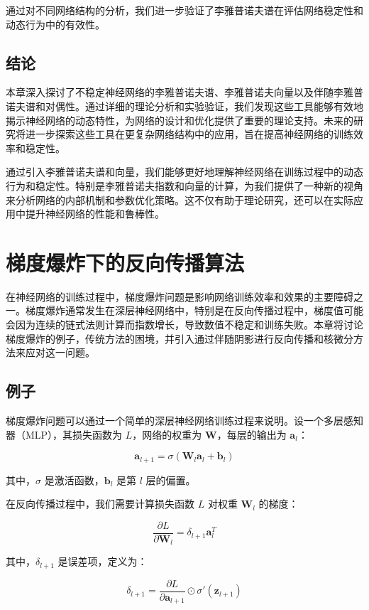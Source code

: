\documentclass[12pt,a4paper]{amsart}
\begin{document}
通过对不同网络结构的分析，我们进一步验证了李雅普诺夫谱在评估网络稳定性和动态行为中的有效性。

\subsection{结论}

本章深入探讨了不稳定神经网络的李雅普诺夫谱、李雅普诺夫向量以及伴随李雅普诺夫谱和对偶性。通过详细的理论分析和实验验证，我们发现这些工具能够有效地揭示神经网络的动态特性，为网络的设计和优化提供了重要的理论支持。未来的研究将进一步探索这些工具在更复杂网络结构中的应用，旨在提高神经网络的训练效率和稳定性。

通过引入李雅普诺夫谱和向量，我们能够更好地理解神经网络在训练过程中的动态行为和稳定性。特别是李雅普诺夫指数和向量的计算，为我们提供了一种新的视角来分析网络的内部机制和参数优化策略。这不仅有助于理论研究，还可以在实际应用中提升神经网络的性能和鲁棒性。

\section{梯度爆炸下的反向传播算法}

在神经网络的训练过程中，梯度爆炸问题是影响网络训练效率和效果的主要障碍之一。梯度爆炸通常发生在深层神经网络中，特别是在反向传播过程中，梯度值可能会因为连续的链式法则计算而指数增长，导致数值不稳定和训练失败。本章将讨论梯度爆炸的例子，传统方法的困境，并引入通过伴随阴影进行反向传播和核微分方法来应对这一问题。

\subsection{例子}

梯度爆炸问题可以通过一个简单的深层神经网络训练过程来说明。设一个多层感知器（MLP），其损失函数为 \( L \)，网络的权重为 \(\mathbf{W}\)，每层的输出为 \(\mathbf{a}_l\)：

\[ \mathbf{a}_{l+1} = \sigma(\mathbf{W}_l \mathbf{a}_l + \mathbf{b}_l) \]

其中，\(\sigma\) 是激活函数，\(\mathbf{b}_l\) 是第 \(l\) 层的偏置。

在反向传播过程中，我们需要计算损失函数 \(L\) 对权重 \(\mathbf{W}_l\) 的梯度：

\[ \frac{\partial L}{\partial \mathbf{W}_l} = \delta_{l+1} \mathbf{a}_l^T \]

其中，\(\delta_{l+1}\) 是误差项，定义为：

\[ \delta_{l+1} = \frac{\partial L}{\partial \mathbf{a}_{l+1}} \odot \sigma'(\mathbf{z}_{l+1}) \]
\end{document}
